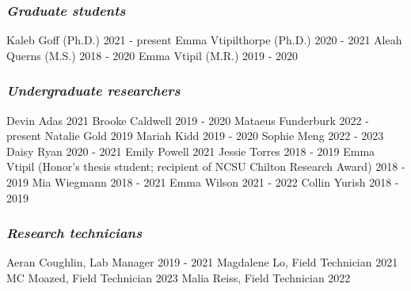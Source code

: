 \documentclass[11pt,english]{article}\usepackage[]{graphicx}\usepackage[]{xcolor}
\begin{document}
\subsubsection*{\emph{Graduate students}}
Kaleb Goff (Ph.D.) \hfill {2021 - present} \newline
Emma Vtipilthorpe (Ph.D.) \hfill {2020 - 2021} \newline
Aleah Querns (M.S.) \hfill {2018 - 2020} \newline
Emma Vtipil (M.R.) \hfill {2019 - 2020}

\subsubsection*{\emph{Undergraduate researchers}}
Devin Adas \hfill {2021} \newline
Brooke Caldwell \hfill {2019 - 2020} \newline
Mataeus Funderburk \hfill {2022 - present} \newline
Natalie Gold \hfill {2019} \newline
Mariah Kidd \hfill {2019 - 2020} \newline
Sophie Meng \hfill {2022 - 2023} \newline 
Daisy Ryan \hfill {2020 - 2021} \newline 
Emily Powell \hfill {2021} \newline 
Jessie Torres \hfill {2018 - 2019} \newline
Emma Vtipil (Honor's thesis student; recipient of NCSU Chilton Research Award) \hfill {2018 - 2019} \newline
Mia Wiegmann \hfill {2018 - 2021} \newline 
Emma Wilson \hfill {2021 - 2022} \newline 
Collin Yurish \hfill {2018 - 2019} 

\subsubsection*{\emph{Research technicians}}
Aeran Coughlin, Lab Manager \hfill {2019 - 2021} \newline
Magdalene Lo, Field Technician \hfill {2021} \newline
MC Moazed, Field Technician \hfill {2023} \newline
Malia Reiss, Field Technician \hfill {2022} 
\end{document}
